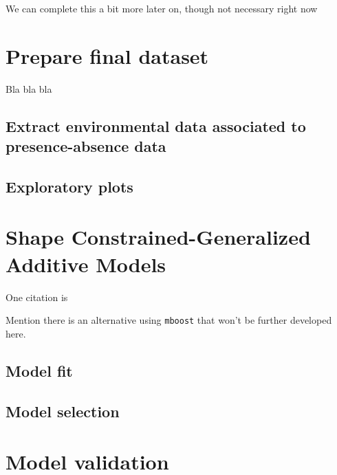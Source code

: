 \documentclass[
]{book}
\begin{document}
We can complete this a bit more later on, though not necessary right now

\hypertarget{prepare-final-dataset}{%
\chapter{Prepare final dataset}\label{prepare-final-dataset}}

Bla bla bla

\hypertarget{extract-environmental-data-associated-to-presence-absence-data}{%
\section{Extract environmental data associated to presence-absence data}\label{extract-environmental-data-associated-to-presence-absence-data}}

\hypertarget{exploratory-plots}{%
\section{Exploratory plots}\label{exploratory-plots}}

\hypertarget{shape-constrained-generalized-additive-models}{%
\chapter{Shape Constrained-Generalized Additive Models}\label{shape-constrained-generalized-additive-models}}

One citation is \citep{citores_etal_2020}

Mention there is an alternative using \texttt{mboost} that won't be further developed here.

\hypertarget{model-fit}{%
\section{Model fit}\label{model-fit}}

\hypertarget{model-selection}{%
\section{Model selection}\label{model-selection}}

\hypertarget{model-validation}{%
\chapter{Model validation}\label{model-validation}}
\end{document}
